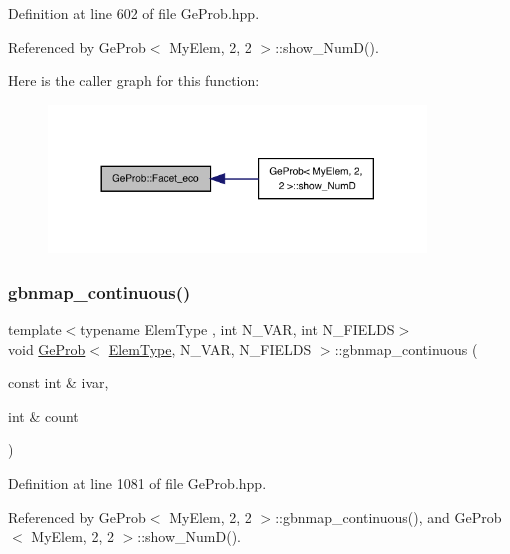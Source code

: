 Definition at line 602 of file Ge\+Prob.\+hpp.



Referenced by Ge\+Prob$<$ My\+Elem, 2, 2 $>$\+::show\+\_\+\+Num\+D().

Here is the caller graph for this function\+:
\nopagebreak
\begin{figure}[H]
\begin{center}
\leavevmode
\includegraphics[width=284pt]{classGeProb_ae30b85570c7c33bb4429f9ed91532807_icgraph}
\end{center}
\end{figure}
\mbox{\label{classGeProb_aa2d34febad6985ceacd95ba6e10536f8}} 
\subsubsection{\texorpdfstring{gbnmap\+\_\+continuous()}{gbnmap\_continuous()}\hspace{0.1cm}{\footnotesize\ttfamily [1/2]}}
{\footnotesize\ttfamily template$<$typename Elem\+Type , int N\+\_\+\+V\+AR, int N\+\_\+\+F\+I\+E\+L\+DS$>$ \\
void \hyperlink{classGeProb}{Ge\+Prob}$<$ \hyperlink{spectral_8h_aaa2c1a7b2d1b12c590d730fe6ac839fa}{Elem\+Type}, N\+\_\+\+V\+AR, N\+\_\+\+F\+I\+E\+L\+DS $>$\+::gbnmap\+\_\+continuous (\begin{DoxyParamCaption}\item[{const int \&}]{ivar,  }\item[{int \&}]{count }\end{DoxyParamCaption})}



Definition at line 1081 of file Ge\+Prob.\+hpp.



Referenced by Ge\+Prob$<$ My\+Elem, 2, 2 $>$\+::gbnmap\+\_\+continuous(), and Ge\+Prob$<$ My\+Elem, 2, 2 $>$\+::show\+\_\+\+Num\+D().

